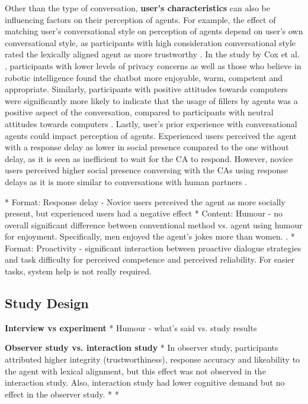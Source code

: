 \documentclass[sigconf,screen,review, anonymous]{acmart}
\newcommand{\cmt}[1]{}%
\begin{document}
Other than the type of conversation, \textbf{user's characteristics} can also be influencing factors on their perception of agents. For example, the effect of matching user's conversational style on perception of agents depend on user's own conversational style, as participants with high consideration conversational style rated the lexically aligned agent as more trustworthy \cite{hoegen2019end}\cmt{[31]}. In the study by Cox et al. \cite{cox2022does}\cmt{[27]}, participants with lower levels of privacy concerns as well as those who believe in robotic intelligence found the chatbot more enjoyable, warm, competent and appropriate. Similarly, participants with positive attitudes towards computers were significantly more likely to indicate that the usage of fillers by agents was a positive aspect of the conversation, compared to participants with neutral attitudes towards computers \cite{pfeifer2009should}\cmt{[12]}. Lastly, user's prior experience with conversational agents could impact perception of agents. Experienced users perceived the agent with a response delay as lower in social presence compared to the one without delay, as it is seen as inefficient to wait for the CA to respond. However, novice users perceived higher social presence conversing with the CAs using response delays as it is more similar to conversations with human partners \cite{gnewuch2018faster}\cmt{[19]}.

* Format: Response delay - Novice users perceived the agent as more socially present, but experienced users had a negative effect \cite{gnewuch2022opposing}\cmt{[20]}
* Content: Humour - no overall significant difference between conventional method vs. agent using humour for enjoyment. Specifically, men enjoyed the agent's jokes more than women.  \cite{miyamoto2017improving}\cmt{[46]}.
* Format: Proactivity - significant interaction between proactive dialogue strategies and task difficulty for perceived competence and perceived reliability. For easier tasks, system help is not really required. \cite{kraus2020effects}\cmt{[64]}

\subsection{Study Design}

\textbf{Interview vs experiment}
* Humour - what's said vs. study results

\textbf{Observer study vs. interaction study}
* In observer study, participants attributed higher integrity (trustworthiness), response accuracy and likeability to the agent with lexical alignment, but this effect was not observed in the interaction study. Also, interaction study had lower cognitive demand but no effect in the observer study. \cite{linnemann2018can}\cmt{[15]}
* \cite{zhu2022effects}\cmt{[26]}
* \cite{cox2022does}\cmt{[27]}
\end{document}
